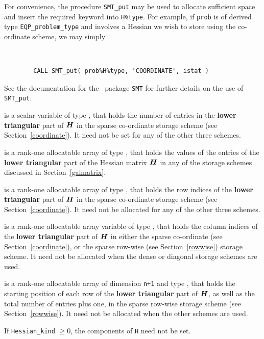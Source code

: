 \documentclass{galahad}
\newcommand{\packagename}{EQP}
\begin{document}
\begin{description}
\begin{description}
For convenience, the procedure {\tt SMT\_put} 
may be used to allocate sufficient space and insert the required keyword
into {\tt H\%type}.
For example, if {\tt prob} is of derived type {\tt \packagename\_problem\_type}
and involves a Hessian we wish to store using the co-ordinate scheme,
we may simply
{\tt 
\begin{verbatim}
        CALL SMT_put( prob%H%type, 'COORDINATE', istat )
\end{verbatim}
}
\noindent
See the documentation for the \galahad\ package {\tt SMT} 
for further details on the use of {\tt SMT\_put}.

 is a scalar variable of type \integer, that 
holds the number of entries in the {\bf lower triangular} part of ${\bm{H}}$
in the sparse co-ordinate storage scheme (see Section~\ref{coordinate}). 
It need not be set for any of the other three schemes.

 is a rank-one allocatable array of type \realdp, that holds
the values of the entries of the {\bf lower triangular} part
of the Hessian matrix ${\bm{H}}$ in any of the 
storage schemes discussed in Section~\ref{galmatrix}.

 is a rank-one allocatable array of type \integer,
that holds the row indices of the {\bf lower triangular} part of ${\bm{H}}$ 
in the sparse co-ordinate storage
scheme (see Section~\ref{coordinate}). 
It need not be allocated for any of the other three schemes.

 is a rank-one allocatable array variable of type \integer,
that holds the column indices of the {\bf lower triangular} part of 
${\bm{H}}$ in either the sparse co-ordinate 
(see Section~\ref{coordinate}), or the sparse row-wise 
(see Section~\ref{rowwise}) storage scheme.
It need not be allocated when the dense or diagonal storage schemes are used.

 is a rank-one allocatable array of dimension {\tt n+1} and type 
\integer, that holds the starting position of 
each row of the {\bf lower triangular} part of ${\bm{H}}$, as well
as the total number of entries plus one, in the sparse row-wise storage
scheme (see Section~\ref{rowwise}). It need not be allocated when the
other schemes are used.

\end{description}
If {\tt Hessian\_kind} $\geq 0$, the components of {\tt H} need not be set.


\end{description}
\end{document}

